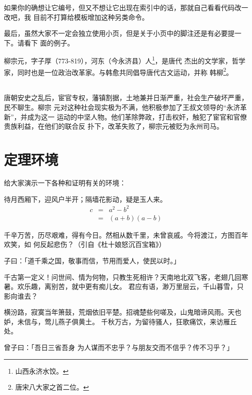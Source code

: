 如果你的确想让它编号，但又不想让它出现在索引中的话，那就自己看看代码改一改吧，我
目前不打算给模板增加这种另类命令。

最后，虽然大家不一定会独立使用小页，但是关于小页中的脚注还是有必要提一下。请看下
面的例子。

\begin{minipage}[t]{\linewidth-2\parindent}
  柳宗元，字子厚（773-819），河东（今永济县）人\footnote{山西永济水饺。}，是唐代
  杰出的文学家，哲学家，同时也是一位政治改革家。与韩愈共同倡导唐代古文运动，并称
  韩柳\footnote{唐宋八大家之首二位。}。
\end{minipage}\\[-5pt]

唐朝安史之乱后，宦官专权，藩镇割据，土地兼并日渐严重，社会生产破坏严重，民不聊生。柳宗
元对这种社会现实极为不满，他积极参加了王叔文领导的“永济革新”，并成为这一
运动的中坚人物。他们革除弊政，打击权奸，触犯了宦官和官僚贵族利益，在他们的联合反
扑下，改革失败了，柳宗元被贬为永州司马。

\section{定理环境}
\label{sec:theorem}

给大家演示一下各种和证明有关的环境：

\begin{assumption}
待月西厢下，迎风户半开；隔墙花影动，疑是玉人来。
\begin{eqnarray}
  \label{eq:eqnxmp}
  c & = & a^2 - b^2\\
    & = & (a+b)(a-b)
\end{eqnarray}
\end{assumption}

千辛万苦，历尽艰难，得有今日。然相从数千里，未曾哀戚。今将渡江，方图百年欢笑，如
何反起悲伤？（引自《杜十娘怒沉百宝箱》）

\begin{definition}
子曰：「道千乘之国，敬事而信，节用而爱人，使民以时。」
\end{definition}

千古第一定义！问世间、情为何物，只教生死相许？天南地北双飞客，老翅几回寒暑。欢乐趣，离别苦，就中更有痴儿女。
君应有语，渺万里层云，千山暮雪，只影向谁去？

横汾路，寂寞当年箫鼓，荒烟依旧平楚。招魂楚些何嗟及，山鬼暗谛风雨。天也妒，未信与，莺儿燕子俱黄土。
千秋万古，为留待骚人，狂歌痛饮，来访雁丘处。

\begin{proposition}
 曾子曰：「吾日三省吾身 \pozhehao 为人谋而不忠乎？与朋友交而不信乎？传不习乎？」
\end{proposition}

